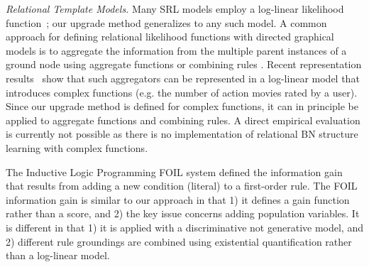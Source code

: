 \documentclass{article}
\begin{document}
{\em Relational Template Models.} Many SRL models employ a log-linear likelihood function~\cite{Kimmig2014}; our upgrade method generalizes to any such model. A common approach for defining relational likelihood functions with directed graphical models is to aggregate the information from the multiple parent instances of a ground node using aggregate functions \cite{Getoorprm2001} or combining rules \cite{Poole2003}. 
Recent representation results~\cite{Buchman2015} show that such aggregators can be represented in a log-linear model that introduces complex functions (e.g. the number of action movies rated by a user). 
Since our upgrade method is defined for complex functions, it can in principle be applied to aggregate functions and combining rules. 
A direct empirical evaluation is currently not possible as there is no implementation of relational BN structure learning with complex functions.

The Inductive Logic Programming FOIL system \cite{foil} defined the information gain that results from adding a new condition (literal) to a first-order rule. The FOIL information gain is similar to our approach in that 1) it defines a gain function rather than a score, and 2) the key issue concerns adding population variables. It is different in that 1) it is applied with a discriminative not generative model, and 2) different rule groundings are combined using existential quantification rather than a log-linear model.






\end{document}
